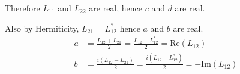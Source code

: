 Therefore $L_{11}$ and $L_{22}$ are real, hence $c$ and $d$ are real.

\bigskip
Also by Hermiticity, $L_{21}=L_{12}^*$ hence $a$ and $b$ are real.
\begin{align*}
a&=\frac{L_{12}+L_{21}}{2}=\frac{L_{12}+L_{12}^*}{2}=\text{Re}(L_{12})
\\
b&=\frac{i(L_{12}-L_{21})}{2}=\frac{i(L_{12}-L_{12}^*)}{2}=-\text{Im}(L_{12})
\end{align*}


